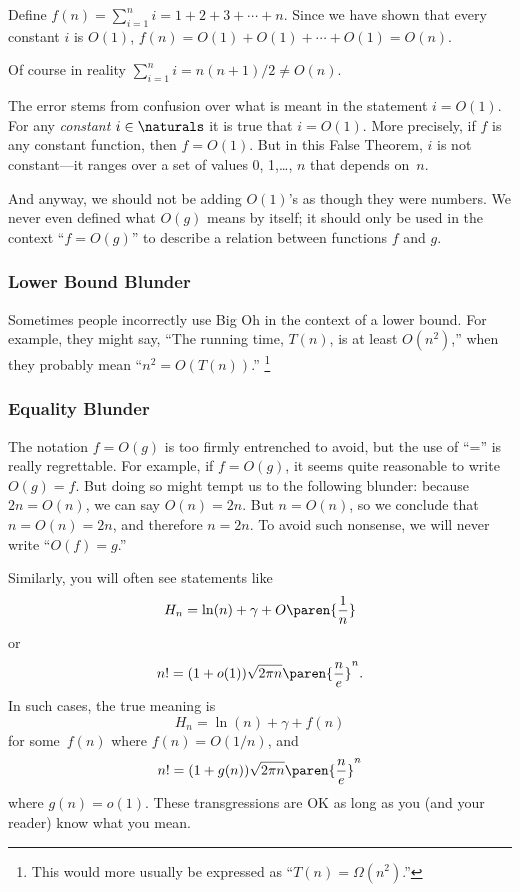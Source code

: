 \begin{bogusproof}
Define $f(n) = \sum_{i=1}^n i = 1 + 2 + 3 + \cdots + n$.  Since we
have shown that every constant $i$ is $O(1)$, $f(n) = O(1) + O(1) +
\cdots + O(1) = O(n)$.
\end{bogusproof}

Of course in reality $\sum_{i=1}^n i = n(n+1)/2 \neq O(n)$.

The error stems from confusion over what is meant in the statement $i
= O(1)$.  For any \emph{constant} $i\in \naturals$ it is true that $i
= O(1)$.  More precisely, if $f$ is any constant function, then $f =
O(1)$.  But in this False Theorem, $i$ is not constant---it ranges
over a set of values 0, 1,\dots, $n$ that depends on~$n$.

And anyway, we should not be adding $O(1)$'s as though they were numbers.
We never even defined what $O(g)$ means by itself; it should only be used
in the context ``$f = O(g)$'' to describe a relation between functions $f$
and $g$.

\subsubsection{Lower Bound Blunder}

Sometimes people incorrectly use Big Oh in the context of a lower
bound.  For example, they might say, ``The running time, $T(n)$, is at
least $O(n^2)$,'' when they probably mean ``$n^2 = O(T(n))$.''
\footnote{This would more usually be expressed as
``$T(n) = \Omega(n^2)$.''}

\subsubsection{Equality Blunder}

The notation $f = O(g)$ is too firmly entrenched to avoid, but the use of
``='' is really regrettable.  For example, if $f = O(g)$, it seems quite
reasonable to write $O(g) = f$.  But doing so might tempt us to the
following blunder: because $2n = O(n)$, we can say $O(n) = 2n$.  But $n =
O(n)$, so we conclude that $n = O(n) = 2n$, and therefore $n = 2n$.  To
avoid such nonsense, we will never write ``$O(f) = g$.''

Similarly, you will often see statements like
\[
    H_n = \ln(n) + \gamma + O\paren{\frac{1}{n}}
\]
or
\[
    n! = (1 + o(1)) \sqrt{2\pi n} \paren{\frac{n}{e}}^n.
\]
In such cases, the true meaning is
\[
    H_n = \ln(n) + \gamma + f(n)
\]
for some~$f(n)$ where $f(n) = O(1/n)$, and
\[
    n! = (1 + g(n)) \sqrt{2\pi n} \paren{\frac{n}{e}}^n
\]
where $g(n) = o(1)$.  These transgressions are OK as long as you (and
your reader) know what you mean.

